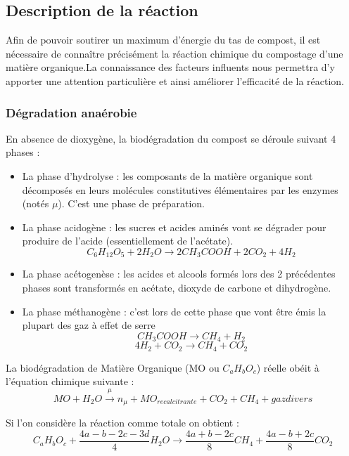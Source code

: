\documentclass[../PS6_RapportFinal.tex]{subfiles}
\begin{document}
\graphicspath{{img/}{tex/img/}}
\subsection{Description de la réaction}

Afin de pouvoir soutirer un maximum d'énergie du tas de compost, il est nécessaire de connaître précisément la réaction chimique du compostage d'une matière organique.La connaissance des facteurs influents nous permettra d'y apporter une attention particulière et ainsi améliorer l'efficacité de la réaction.

\subsubsection{Dégradation anaérobie}
En absence de dioxygène, la biodégradation du compost se déroule suivant 4 phases :
\begin{itemize}
\item La phase d’hydrolyse : les composants de la matière organique sont décomposés en leurs molécules constitutives élémentaires par les enzymes (notés \(\mu\)). C’est une phase de préparation.

\item La phase acidogène : les sucres et acides aminés vont se dégrader pour produire de l'acide (essentiellement de l'acétate).
\[C_6H_{12}O_5 +2H_2O \longrightarrow 2 CH_3COOH + 2CO_2 + 4 H_2\]
	


\item La phase acétogenèse : les acides et alcools formés lors des 2 précédentes phases sont transformés en acétate, dioxyde de carbone et dihydrogène.

\item La phase méthanogène : c’est lors de cette phase que vont être émis la plupart des gaz à effet de serre  
\[CH_3COOH \longrightarrow CH_4 + H_2\]
\[4H_2 + CO_2 \longrightarrow  CH_4 + CO_2\]

\end{itemize}

\vspace{3mm}

La biodégradation de Matière Organique (MO ou \(C_aH_bO_c\)) réelle obéit à l’équation chimique suivante :
\[MO + H_2O \stackrel{\mu}{\longrightarrow} n_\mu + MO_{recalcitrante} +CO_2 + CH_4 + gaz divers\]

Si l’on considère la réaction comme \og totale\fg{} on obtient :
\[C_aH_bO_c + \frac{4a - b - 2c -3d}{4}H_2O \longrightarrow \frac{4a + b - 2c}{8}CH_4+ \frac{4a-b+2c}{8} CO_2\]
\end{document}
